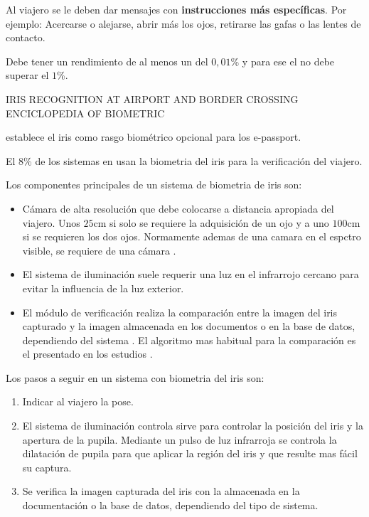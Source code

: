 Al viajero se le deben dar mensajes con \textbf{instrucciones más específicas}. Por ejemplo: Acercarse o alejarse, abrir más los ojos, retirarse las gafas o las lentes de contacto. 

Debe tener un rendimiento de al menos un \textbf{} del $0,01$\% y para ese  el \textbf{} no debe superar el $1$\%. 

\color{red}

IRIS RECOGNITION AT AIRPORT AND BORDER CROSSING ENCICLOPEDIA OF BIOMETRIC 

 establece el iris como rasgo biométrico opcional para los \gls{e-passport}.

El $8$\% de los sistemas  en  usan la biometria del iris para la verificación del viajero.

Los componentes principales de un sistema de \gls{biometria} de \gls{iris} son:

\begin{itemize}
    \item 
    Cámara de alta resolución que debe colocarse a distancia apropiada del viajero. Unos $25$cm si solo se requiere la adquisición de un ojo y a uno $100$cm si se requieren los dos ojos. Normamente ademas de una camara en el espctro visible, se requiere de una cámara .

    \item
    El sistema de iluminación suele requerir una luz en el infrarrojo cercano para evitar la influencia de la luz exterior.
    
    \item
    El módulo de verificación realiza la comparación entre la imagen del iris capturado y la imagen almacenada en los documentos o en la base de datos, dependiendo del sistema . El algoritmo mas habitual para la comparación es el presentado en los estudios \cite{daugman2009iris} \cite{daugman2015iris}.

\end{itemize}

Los pasos a seguir en un sistema con \gls{biometria} del \gls{iris} son:

\begin{enumerate}
    \item 
    Indicar al viajero la pose.
    
    \item
    El sistema de iluminación controla sirve para controlar la posición del iris y la apertura de la pupila. Mediante un pulso de luz infrarroja se controla la dilatación de pupila para que aplicar la región del iris y que resulte mas fácil su captura.
    
    \item
    Se verifica la imagen capturada del iris con la almacenada en la documentación o la base de datos, dependiendo del tipo de sistema. 
\end{enumerate}

